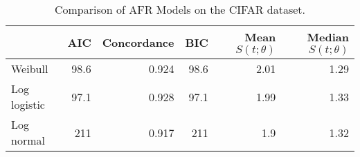 \begin{table}
\centering
\caption{Comparison of AFR Models on the CIFAR dataset.}
\label{tab:cifar}
\begin{tabular}{lrrrrr}
\toprule
{} &  AIC &  Concordance &  BIC &  Mean $S(t; \theta)$ &  Median $S(t; \theta)$ \\
\midrule
Weibull      & 98.6 &        0.924 & 98.6 &                2.01 &                  1.29 \\
Log logistic & 97.1 &        0.928 & 97.1 &                1.99 &                  1.33 \\
Log normal   &  211 &        0.917 &  211 &                 1.9 &                  1.32 \\
\bottomrule
\end{tabular}
\end{table}

